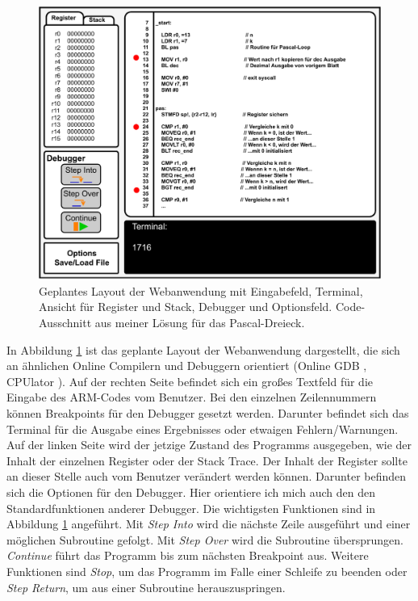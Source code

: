 \documentclass[a4paper, 11pt, onecolumn]{article}
\begin{document}
\begin{figure}[!htb]	
	\includegraphics[width=0.8\paperwidth]{data/layout}
	\caption{Geplantes Layout der Webanwendung mit Eingabefeld, Terminal, Ansicht für Register und Stack, Debugger und Optionsfeld. Code-Ausschnitt aus meiner Lösung für das Pascal-Dreieck.}
	\label{layout}
\end{figure}

In Abbildung \ref{layout} ist das geplante Layout der Webanwendung dargestellt, die sich an ähnlichen Online Compilern und Debuggern orientiert (Online GDB \cite{onlinegdb}, CPUlator \cite{cpulator}). Auf der rechten Seite befindet sich ein großes Textfeld für die Eingabe des ARM-Codes vom Benutzer. Bei den einzelnen Zeilennummern können Breakpoints für den Debugger gesetzt werden. Darunter befindet sich das Terminal für die Ausgabe eines Ergebnisses oder etwaigen Fehlern/Warnungen. Auf der linken Seite wird der jetzige Zustand des Programms ausgegeben, wie der Inhalt der einzelnen Register oder der Stack Trace. Der Inhalt der Register sollte an dieser Stelle auch vom Benutzer verändert werden können. Darunter befinden sich die Optionen für den Debugger. Hier orientiere ich mich auch den den Standardfunktionen anderer Debugger. Die wichtigsten Funktionen sind in Abbildung \ref{layout} angeführt. Mit \textit{Step Into} wird die nächste Zeile ausgeführt und einer möglichen Subroutine gefolgt. Mit \textit{Step Over} wird die Subroutine übersprungen. \textit{Continue} führt das Programm bis zum nächsten Breakpoint aus. Weitere Funktionen sind \textit{Stop}, um das Programm im Falle einer Schleife zu beenden oder \textit{Step Return}, um aus einer Subroutine herauszuspringen.
\end{document}
